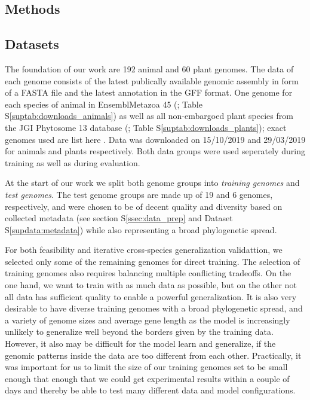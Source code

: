 \documentclass{bioinfo}
\newcounter{suptab}
\newcounter{supdata}
\begin{document}
\begin{methods}
\section{Methods}
\subsection{Datasets}
The foundation of our work are 192 animal and 60 plant genomes. The data of each 
genome consists of the latest publically available genomic assembly in form of a 
FASTA file and the latest annotation in the GFF format. One genome for each species of animal 
in EnsemblMetazoa 45 (\cite{howe2020ensembl}; Table S\ref{suptab:downloads_animals}) 
as well as all non-embargoed plant species from the JGI Phytosome 13 database 
(\cite{goodstein2012phytozome}; Table S\ref{suptab:downloads_plants}); exact 
genomes used are list here . %
Data was downloaded on 15/10/2019 and 29/03/2019 for animals and plants respectively. 
Both data groups were used seperately during training as well as during evaluation. 

At the start of our work we split both genome groups into {\it training genomes} and 
{\it test genomes}. The test genome groups are made up of 19 and 6 genomes, 
respectively, and were chosen to be of decent quality and diversity based on collected 
metadata (see section S\ref{ssec:data_prep} and Dataset S\ref{supdata:metadata}) 
while also representing a broad phylogenetic spread. 

For both feasibility and iterative cross-species generalization validattion, we
selected only some of the remaining genomes for direct training.
The selection of training genomes also requires balancing multiple conflicting 
tradeoffs. On the one hand, we want to train with as much data as possible, but 
on the other
not all data has sufficient quality to enable a powerful generalization. It is 
also very desirable to have diverse training genomes with a broad phylogenetic spread, 
and a variety of genome sizes and average gene length as the model is increasingly unlikely to generalize 
well beyond the borders given by the training data. However, it also may be difficult 
for the model learn and generalize, if the genomic patterns inside the data are 
too different from each other. Practically, it was important for us to limit the size of
our training genomes set to be small enough that enough that we could get experimental 
results within a couple of days and thereby be able to test many different data and 
model configurations.


\end{methods}
\end{document}
